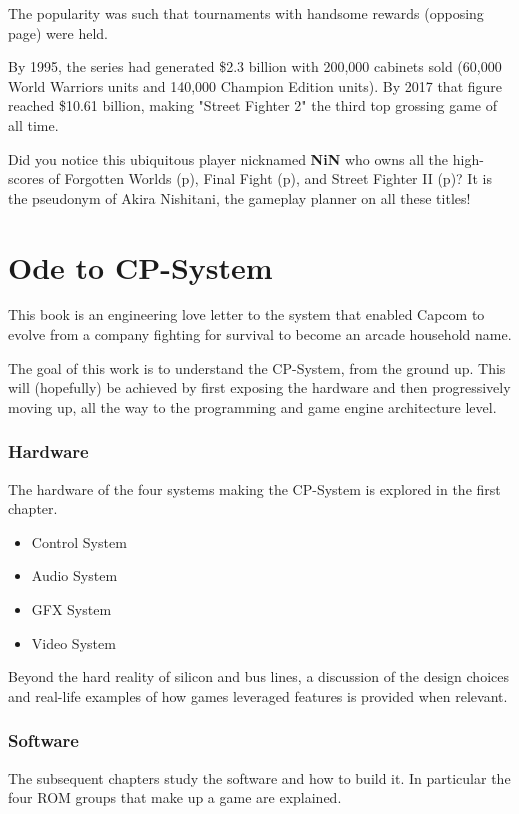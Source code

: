 The popularity was such that tournaments with handsome rewards (opposing page) were held. 

By 1995, the series had generated \$2.3 billion with 200,000 cabinets sold\cite{usgamer20160101} (60,000 World Warriors units and 140,000 Champion Edition units). By 2017 that figure reached \$10.61 billion\cite{gamerevolution20140126}, making "Street Fighter 2" the third top grossing game of all time.

\begin{trivia}
Did you notice this ubiquitous player nicknamed \textbf{NiN} who owns all the high-scores of Forgotten Worlds (p\pageref{nin_fw}), Final Fight (p\pageref{nin_ff}), and Street Fighter II (p\pageref{nin_sf2})? It is the pseudonym of Akira Nishitani, the gameplay planner on all these titles!
\end{trivia}

\section{Ode to CP-System}

This book is an engineering love letter to the system that enabled Capcom to evolve from a company fighting for survival to become an arcade household name.

The goal of this work is to understand the CP-System, from the ground up. This will (hopefully) be achieved by first exposing the hardware and then progressively moving up, all the way to the programming and game engine architecture level.

\subsubsection{Hardware}
The hardware of the four systems making the CP-System is explored in the first chapter.
\begin{itemize}[topsep=0pt]
\item Control System
\item Audio System
\item GFX System
\item Video System
\end{itemize}
 Beyond the hard reality of silicon and bus lines, a discussion of the design choices and real-life examples of how games leveraged features is provided when relevant.


\subsubsection{Software}
The subsequent chapters study the software and how to build it. In particular the four ROM groups that make up a game are explained. 


